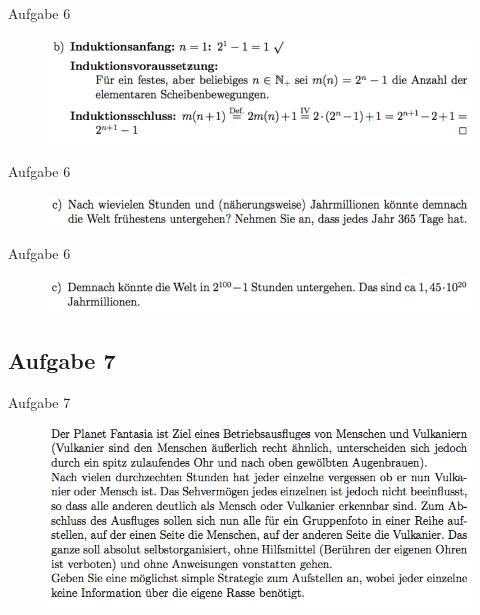 \begin{frame}{Aufgabe 6}
\begin{figure}[h!]
		\centering
		\includegraphics[width=\textwidth]{../topics/weihnachtstut-aufgaben/15.png} 
	\end{figure}     
\end{frame}

\begin{frame}{Aufgabe 6}
\begin{figure}[h!]
		\centering
		\includegraphics[width=\textwidth]{../topics/weihnachtstut-aufgaben/16.png} 
	\end{figure}     
\end{frame}

\begin{frame}{Aufgabe 6}
\begin{figure}[h!]
		\centering
		\includegraphics[width=\textwidth]{../topics/weihnachtstut-aufgaben/17.png} 
	\end{figure}     
\end{frame}

\subsection{Aufgabe 7}
\begin{frame}{Aufgabe 7}
\begin{figure}[h!]
		\centering
		\includegraphics[width=\textwidth]{../topics/weihnachtstut-aufgaben/18.png} 
	\end{figure}     
\end{frame}

